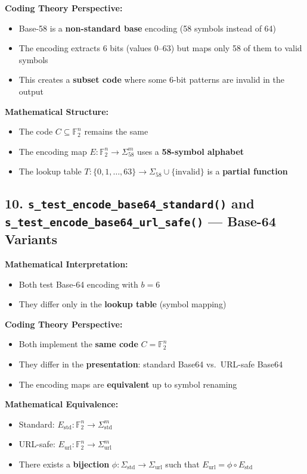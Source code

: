 \documentclass[11pt,a4paper]{article}
\begin{document}
\textbf{Coding Theory Perspective:}
\begin{itemize}
\item Base-58 is a \textbf{non-standard base} encoding (58 symbols instead of 64)
\item The encoding extracts 6 bits (values 0--63) but maps only 58 of them to valid symbols
\item This creates a \textbf{subset code} where some 6-bit patterns are invalid in the output
\end{itemize}

\textbf{Mathematical Structure:}
\begin{itemize}
\item The code $C \subseteq \mathbb{F}_2^n$ remains the same
\item The encoding map $E: \mathbb{F}_2^n \rightarrow \Sigma_{58}^m$ uses a \textbf{58-symbol alphabet}
\item The lookup table $T: \{0, 1, \ldots, 63\} \rightarrow \Sigma_{58} \cup \{\text{invalid}\}$ is a \textbf{partial function}
\end{itemize}

\subsection{10. \texttt{s\_test\_encode\_base64\_standard()} and \texttt{s\_test\_encode\_base64\_url\_safe()} --- Base-64 Variants}

\textbf{Mathematical Interpretation:}
\begin{itemize}
\item Both test Base-64 encoding with $b = 6$
\item They differ only in the \textbf{lookup table} (symbol mapping)
\end{itemize}

\textbf{Coding Theory Perspective:}
\begin{itemize}
\item Both implement the \textbf{same code} $C = \mathbb{F}_2^n$
\item They differ in the \textbf{presentation}: standard Base64 vs.\ URL-safe Base64
\item The encoding maps are \textbf{equivalent} up to symbol renaming
\end{itemize}

\textbf{Mathematical Equivalence:}
\begin{itemize}
\item Standard: $E_{\text{std}}: \mathbb{F}_2^n \rightarrow \Sigma_{\text{std}}^m$
\item URL-safe: $E_{\text{url}}: \mathbb{F}_2^n \rightarrow \Sigma_{\text{url}}^m$
\item There exists a \textbf{bijection} $\phi: \Sigma_{\text{std}} \rightarrow \Sigma_{\text{url}}$ such that $E_{\text{url}} = \phi \circ E_{\text{std}}$
\end{itemize}
\end{document}
